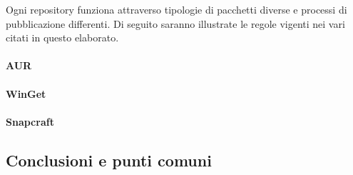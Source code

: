 Ogni repository funziona attraverso tipologie di pacchetti diverse e processi di pubblicazione differenti. Di seguito saranno illustrate le regole vigenti nei vari citati in questo elaborato.

\paragraph{AUR}

\paragraph{WinGet}

\paragraph{Snapcraft}

\subsection{Conclusioni e punti comuni}

